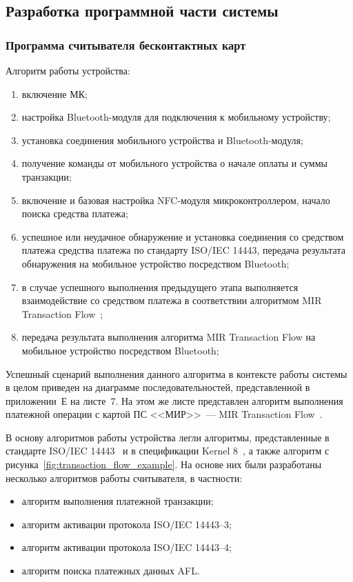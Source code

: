 \subsection{Разработка программной части системы}

\subsubsection{Программа считывателя бесконтактных карт}

Алгоритм работы устройства:
\begin{enumerate}
    \item включение МК;
    \item настройка Bluetooth-модуля для подключения к мобильному устройству;
    \item установка соединения мобильного устройства и Bluetooth-модуля;
    \item получение команды от мобильного устройства о начале оплаты и суммы транзакции;
    \item включение и базовая настройка NFC-модуля микроконтроллером, начало поиска средства платежа;
    \item успешное или неудачное обнаружение и установка соединения со средством платежа средства платежа по стандарту ISO/IEC 14443, передача результата обнаружения на мобильное устройство посредством Bluetooth;
    \item в случае успешного выполнения предыдущего этапа выполняется взаимодействие со средством платежа в соответствии алгоритмом MIR Transaction Flow~\cite{book_mir};
    \item передача результата выполнения алгоритма MIR Transaction Flow на мобильное устройство посредством Bluetooth;
\end{enumerate}

Успешный сценарий выполнения данного алгоритма в контексте работы системы в целом приведен на диаграмме последовательностей, представленной в приложении~Е на листе~7.
На этом же листе представлен алгоритм выполнения платежной операции с картой ПС <<МИР>>~--- MIR Transaction Flow~\cite{book_mir}.

В основу алгоритмов работы устройства легли алгоритмы, представленные в стандарте ISO/IEC 14443~\cite{iso14443-3}\cite{iso14443-4} и в спецификации Kernel 8~\cite{emv_book_c8}, а также алгоритм с рисунка~\ref{fig:transaction_flow_example}.
На основе них были разработаны несколько алгоритмов работы считывателя, в частности:

\begin{itemize}
    \item алгоритм выполнения платежной транзакции;
    \item алгоритм активации протокола ISO/IEC 14443--3;
    \item алгоритм активации протокола ISO/IEC 14443--4;
    \item алгоритм поиска платежных данных AFL.
\end{itemize}

